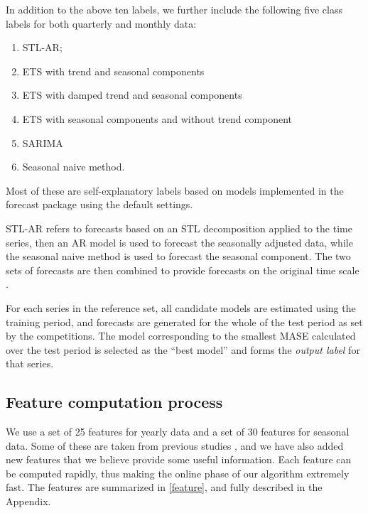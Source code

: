 \documentclass[11pt,a4paper,]{article}
\providecommand{\tightlist}{%
  \setlength{\itemsep}{0pt}\setlength{\parskip}{0pt}}
\theoremstyle{definition}
\theoremstyle{definition}
\theoremstyle{definition}
\theoremstyle{remark}
\begin{document}
In addition to the above ten labels, we further include the following
five class labels for both quarterly and monthly data:

\begin{enumerate}
\def\labelenumi{(\alph{enumi})}
\setcounter{enumi}{9}
\tightlist
\item
  STL-AR;
\item
  ETS with trend and seasonal components
\item
  ETS with damped trend and seasonal components
\item
  ETS with seasonal components and without trend component
\item
  SARIMA
\item
  Seasonal naive method.
\end{enumerate}

Most of these are self-explanatory labels based on models implemented in
the forecast package using the default settings.

STL-AR refers to forecasts based on an STL decomposition applied to the
time series, then an AR model is used to forecast the seasonally
adjusted data, while the seasonal naive method is used to forecast the
seasonal component. The two sets of forecasts are then combined to
provide forecasts on the original time scale
\autocite{hyndman2014forecasting}.

For each series in the reference set, all candidate models are estimated
using the training period, and forecasts are generated for the whole of
the test period as set by the competitions. The model corresponding to
the smallest MASE \autocite{hyndman2006another} calculated over the test
period is selected as the ``best model'' and forms the \emph{output
label} for that series.

\hypertarget{sec:features}{%
\subsection{Feature computation process}\label{sec:features}}

We use a set of 25 features for yearly data and a set of 30 features for
seasonal data. Some of these are taken from previous studies
\autocites{wang2009rule}{hyndman2015large}{kang2017visualising}, and we
have also added new features that we believe provide some useful
information. Each feature can be computed rapidly, thus making the
online phase of our algorithm extremely fast. The features are
summarized in \autoref{feature}, and fully described in the Appendix.
\end{document}
